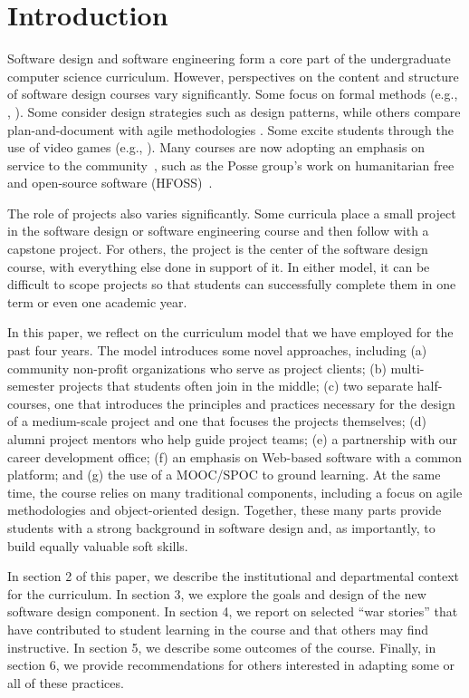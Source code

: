 
\section{Introduction}

Software design and software engineering form a core part of
the undergraduate computer science curriculum. However, perspectives
on the content and structure of software design courses vary
significantly.  Some focus on formal methods (e.g., \cite{liu-2005},
\cite{garcia-2014}).  Some consider design strategies such as design
patterns, while others compare plan-and-document with agile
methodologies \cite{gestwicki-2018}.  Some excite students through
the use of video games (e.g., \cite{wolz-2007}).  Many courses are
now adopting an emphasis on service to the community~\cite{hfoss-2018,buckley-2004,liu-2005,leidig-2006,lange-2011},
such as the Posse group's work on humanitarian free and open-source
software (HFOSS)~\cite{posse-2018}.

The role of projects also varies significantly.  Some curricula
place a small project in the software design or software engineering
course and then follow with a capstone project.  For others, the
project is the center of the software design course, with everything
else done in support of it. In either model, it can be difficult
to scope projects so that students can successfully complete them
in one term or even one academic year.

In this paper, we reflect on the curriculum model that we have
employed for the past four years.  The model introduces some novel
approaches, including (a) community non-profit organizations who
serve as project clients; (b) multi-semester projects that students
often join in the middle; (c) two separate half-courses, one that
introduces the principles and practices necessary for the design
of a medium-scale project and one that focuses the projects themselves;
(d) alumni project mentors who help guide project teams; (e) a
partnership with our career development office; (f) an emphasis on
Web-based software with a common platform; and (g) the use of a
MOOC/SPOC to ground learning.  At the same time, the course relies
on many traditional components, including a focus on agile methodologies
and object-oriented design.  Together, these many parts provide
students with a strong background in software design and, as
importantly, to build equally valuable soft skills.

In section 2 of this paper, we describe the institutional and
departmental context for the curriculum.  In section 3, we explore
the goals and design of the new software design component.  In
section 4, we report on selected ``war stories'' that have contributed
to student learning in the course and that others may find instructive.
In section 5, we describe some outcomes of the course.  Finally,
in section 6, we provide recommendations for others interested in
adapting some or all of these practices.

